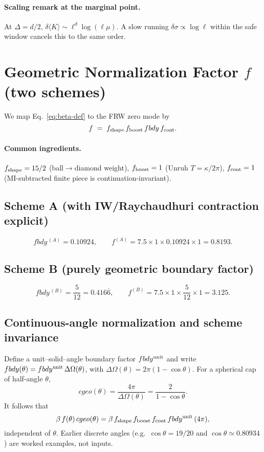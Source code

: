 \documentclass[aps,prd,onecolumn,superscriptaddress,nofootinbib]{revtex4-2}
\def\cgeo{cgeo}%
\def\fbdy{fbdy}%
\newcommand{\cgeo}{c_{\rm geo}}
\newcommand{\fbdy}{f_{\rm bdy}}
\begin{document}
\paragraph*{Scaling remark at the marginal point.}
At \(\Delta=d/2\), \(\delta\!\langle K\rangle\sim \ell^{d}\log(\ell\mu)\). A slow running \(\delta\sigma\propto\log \ell\) within the safe window cancels this to the same order.

\section{Geometric Normalization Factor \texorpdfstring{$f$}{f} (two schemes)}
\label{sec:f-norm}
We map Eq.~\eqref{eq:beta-def} to the FRW zero mode by
\begin{equation}
f \;=\; f_{\rm shape}\, f_{\rm boost}\, \fbdy\, f_{\rm cont}.
\end{equation}

\paragraph*{Common ingredients.}
\(f_{\rm shape}=15/2\) (ball\(\to\)diamond weight), \(f_{\rm boost}=1\) (Unruh \(T=\kappa/2\pi\)), \(f_{\rm cont}=1\) (MI-subtracted finite piece is continuation-invariant).

\subsection{Scheme A (with IW/Raychaudhuri contraction explicit)}
\[
\fbdy^{\,(A)}=0.10924,\qquad
f^{(A)}=7.5\times 1 \times 0.10924 \times 1=0.8193.
\]

\subsection{Scheme B (purely geometric boundary factor)}
\[
\fbdy^{\,(B)}=\frac{5}{12}=0.416\overline{6},\qquad
f^{(B)}=7.5\times 1 \times \frac{5}{12}\times 1=3.125.
\]

\subsection{Continuous-angle normalization and scheme invariance}
\label{sec:theta-invariance}
Define a unit–solid–angle boundary factor \(\fbdy^{\rm unit}\) and write
\(\fbdy(\theta)=\fbdy^{\rm unit}\,\Delta\Omega(\theta)\), with \(\Delta\Omega(\theta)=2\pi(1-\cos\theta)\).
For a spherical cap of half-angle \(\theta\),
\begin{equation}
\cgeo(\theta)=\frac{4\pi}{\Delta\Omega(\theta)}=\frac{2}{1-\cos\theta}.
\end{equation}
It follows that
\begin{equation}
\beta\,f(\theta)\,\cgeo(\theta)
= \beta\,f_{\rm shape}\,f_{\rm boost}\,f_{\rm cont}\,\fbdy^{\rm unit}\,(4\pi),
\end{equation}
independent of \(\theta\). Earlier discrete angles (e.g.\ \(\cos\theta=19/20\) and \(\cos\theta\simeq0.80934\)) are worked examples, not inputs.
\end{document}
